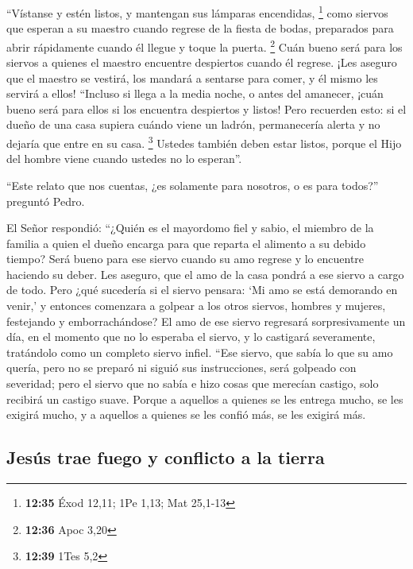  ``Vístanse y estén listos, y mantengan sus lámparas
encendidas, \footnote{\textbf{12:35} Éxod 12,11; 1Pe 1,13; Mat 25,1-13}
 como siervos que esperan a su maestro cuando regrese de
la fiesta de bodas, preparados para abrir rápidamente cuando él llegue y
toque la puerta. \footnote{\textbf{12:36} Apoc 3,20} 
Cuán bueno será para los siervos a quienes el maestro encuentre
despiertos cuando él regrese. ¡Les aseguro que el maestro se vestirá,
los mandará a sentarse para comer, y él mismo les servirá a ellos!
 ``Incluso si llega a la media noche, o antes del
amanecer, ¡cuán bueno será para ellos si los encuentra despiertos y
listos!  Pero recuerden esto: si el dueño de una casa
supiera cuándo viene un ladrón, permanecería alerta y no dejaría que
entre en su casa. \footnote{\textbf{12:39} 1Tes 5,2} 
Ustedes también deben estar listos, porque el Hijo del hombre viene
cuando ustedes no lo esperan''.

 ``Este relato que nos cuentas, ¿es solamente para
nosotros, o es para todos?'' preguntó Pedro.

 El Señor respondió: ``¿Quién es el mayordomo fiel y
sabio, el miembro de la familia a quien el dueño encarga para que
reparta el alimento a su debido tiempo?  Será bueno para
ese siervo cuando su amo regrese y lo encuentre haciendo su deber.
 Les aseguro, que el amo de la casa pondrá a ese siervo a
cargo de todo.  Pero ¿qué sucedería si el siervo pensara:
`Mi amo se está demorando en venir,' y entonces comenzara a golpear a
los otros siervos, hombres y mujeres, festejando y emborrachándose?
 El amo de ese siervo regresará sorpresivamente un día,
en el momento que no lo esperaba el siervo, y lo castigará severamente,
tratándolo como un completo siervo infiel.  ``Ese siervo,
que sabía lo que su amo quería, pero no se preparó ni siguió sus
instrucciones, será golpeado con severidad;  pero el
siervo que no sabía e hizo cosas que merecían castigo, solo recibirá un
castigo suave. Porque a aquellos a quienes se les entrega mucho, se les
exigirá mucho, y a aquellos a quienes se les confió más, se les exigirá
más.

\hypertarget{jesuxfas-trae-fuego-y-conflicto-a-la-tierra}{%
\subsection{Jesús trae fuego y conflicto a la
tierra}\label{jesuxfas-trae-fuego-y-conflicto-a-la-tierra}}

